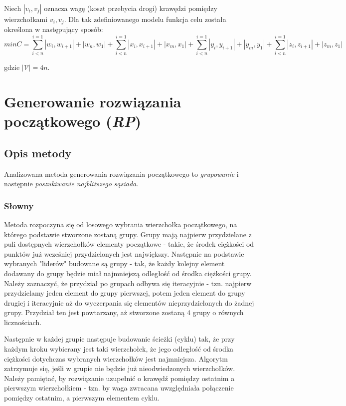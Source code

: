 \documentclass{article}
\begin{document}
Niech $|{v_i, v_j}|$ oznacza wagę (koszt przebycia drogi) krawędzi pomiędzy wierzchołkami $v_i, v_j$. Dla tak zdefiniowanego modelu funkcja celu została określona w następujący sposób:
\begin{equation}
min C = \sum \limits_{i<n}^{i=1} |w_i,w_{i+1}| + |w_n,w_1| + \sum \limits_{i<n}^{i=1} |x_i,x_{i+1}| + |x_m,x_1| + \sum \limits_{i<n}^{i=1} |y_i,y_{i+1}| + |y_m,y_1| + \sum \limits_{i<n}^{i=1} |z_i,z_{i+1}| + |z_m,z_1|
\end{equation}

gdzie $|\mathcal{V}| = 4n$.

\section{Generowanie rozwiązania początkowego (\emph{RP})}
\subsection{Opis metody}
Analizowana metoda generowania rozwiązania początkowego to \emph{grupowanie} i następnie \emph{poszukiwanie najbliższego sąsiada}.

\subsubsection{Słowny} \label{sec:slownyrp}
Metoda rozpoczyna się od losowego wybrania wierzchołka początkowego, na którego podstawie stworzone zostaną grupy. Grupy mają najpierw przydzielane z puli dostępnych wierzchołków elementy początkowe - takie, że środek ciężkości od punktów już wcześniej przydzielonych jest największy. Następnie na podstawie wybranych "liderów" budowane są grupy - tak, że każdy kolejny element dodawany do grupy będzie miał najmniejszą odległość od środka ciężkości grupy. Należy zaznaczyć, że przydział po grupach odbywa się iteracyjnie - tzn. najpierw przydzielamy jeden element do grupy pierwszej, potem jeden element do grupy drugiej i iteracyjnie aż do wyczerpania się elementów nieprzydzielonych do żadnej grupy. Przydział ten jest powtarzany, aż stworzone zostaną 4 grupy o równych licznościach.

Następnie w każdej grupie następuje budowanie ścieżki (cyklu) tak, że przy każdym kroku wybierany jest taki wierzchołek, że jego odległość od środka ciężkości dotychczas wybranych wierzchołków jest najmniejsza. Algorytm zatrzymuje się, jeśli w grupie nie będzie już nieodwiedzonych wierzchołków. Należy pamiętać, by rozwiązanie uzupełnić o krawędź pomiędzy ostatnim a pierwszym wierzchołkiem - tzn. by waga zwracana uwzględniała połączenie pomiędzy ostatnim, a pierwszym elementem cyklu.
\end{document}
